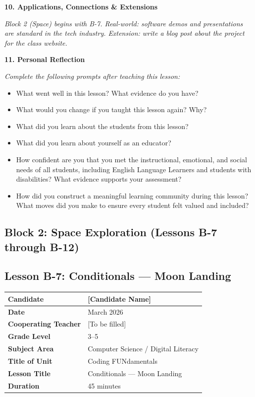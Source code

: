 \documentclass[11pt,letterpaper]{article}
\begin{document}
\textbf{10. Applications, Connections \& Extensions}

\textit{Block 2 (Space) begins with B-7. Real-world: software demos and presentations are standard in the tech industry. Extension: write a blog post about the project for the class website.}

\textbf{11. Personal Reflection}

\textit{Complete the following prompts after teaching this lesson:}

\begin{itemize}
  \item What went well in this lesson? What evidence do you have?

  \item What would you change if you taught this lesson again? Why?

  \item What did you learn about the students from this lesson?

  \item What did you learn about yourself as an educator?

  \item How confident are you that you met the instructional, emotional, and social needs of all students, including English Language Learners and students with disabilities? What evidence supports your assessment?

  \item How did you construct a meaningful learning community during this lesson? What moves did you make to ensure every student felt valued and included?
\end{itemize}

\newpage
\subsection{Block 2: Space Exploration (Lessons B-7 through B-12)}
\label{sub:Block2SpaceExplorationLessonsB7throughB12}

\subsection{Lesson B-7: Conditionals --- Moon Landing}
\label{sub:LessonB7ConditionalsMoonLanding}

\begin{longtable}{|L{0.28\textwidth}|L{0.65\textwidth}|}
\hline
\textbf{Candidate}  & [Candidate Name]  \\
\hline
\textbf{Date}  & March 2026  \\
\hline
\textbf{Cooperating Teacher}  & [To be filled]  \\
\hline
\textbf{Grade Level}  & 3--5  \\
\hline
\textbf{Subject Area}  & Computer Science / Digital Literacy  \\
\hline
\textbf{Title of Unit}  & Coding FUNdamentals  \\
\hline
\textbf{Lesson Title}  & Conditionals --- Moon Landing  \\
\hline
\textbf{Duration}  & 45 minutes  \\
\hline
\end{longtable}
\end{document}
